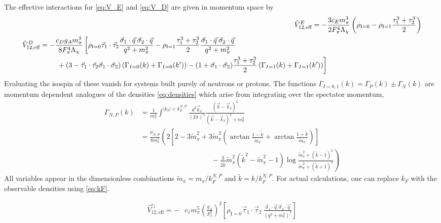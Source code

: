 \documentclass[%
 preprint,
 amsmath,amssymb,
 aps,
]{revtex4-1}
\newcommand{\veff}{\hat{V}_{12,\text{eff}}}
\newcommand{\rhozero}{\rho_{\text{I}=0}}
\newcommand{\rhoone}{\rho_{\text{I}=1}}
\newcommand{\taudot}{\vec{\tau}_1\cdot\vec{\tau}_2}
\newcommand{\sigmadot}{\vec{\sigma}_1\cdot\vec{\sigma}_2}
\begin{document}
 The effective interactions for \eqref{eq:V_E} and \eqref{eq:V_D} are given in momentum space by
 \begin{align}
 \veff^E=-&\frac{3c_Em_\pi^3}{2F_\pi^4 \Lambda_\chi}\left(\rhozero-\rhoone\frac{\tau_1^3+\tau_2^3}{2}\right)\\
 \begin{split}
 \veff^D=-&\frac{c_Dg_A m_\pi^3}{8 F_\pi^4\Lambda_\chi}\left[\rhozero\taudot \frac{\vec{\sigma}_1\cdot\vec{q}\:\vec{\sigma}_2\cdot\vec{q} }{q^2+m_\pi^2}  - \rhoone \frac{\tau_1^3+\tau_2^3}{2}\frac{\vec{\sigma}_1\cdot\vec{q}\:\vec{\sigma}_2\cdot\vec{q} }{q^2+m_\pi^2} \right. \\
&\left. \vphantom{\frac{1}{1}}+ (3-\taudot\sigmadot) \left(\Gamma_{I=0}(k)+\Gamma_{I=0}(k')\right)  -(1+\sigmadot)\frac{\tau_1^3+\tau_2^3}{2} \left(\Gamma_{I=1}(k) + \Gamma_{I=1}(k')\right) \right]
 \end{split} 
 \end{align}
Evaluating the isospin  of these vanish for systems built purely of neutrons or protons. The functions $\Gamma_{I=0,1}(k)=\Gamma_{P}(k)\pm\Gamma_{N}(k)$ are momentum dependent analogues of the densities \eqref{eq:densities} which arise from integrating over the spectator momentum,
 \begin{equation}
 \begin{split}
 \Gamma_{N,P}(k)&=\frac{1}{m_\pi^3}\int^{|k_\delta|<k_F^{N,P}}\frac{d^3\vec{k}_\delta}{(2\pi)^3} \frac{(\vec{k}-\vec{k}_\delta)^2}{(\vec{k}-\vec{k}_\delta)^2+m_\pi^2} \\
 &=\frac{\rho_{N,P}}{8m_\pi^3}\left(2\left[2-3\tilde{m}_\pi^2+3\tilde{m}_\pi^3\left(\arctan\frac{1-\tilde{k}}{\tilde{m}_\pi}+\arctan\frac{1+\tilde{k}}{\tilde{m}_\pi}\right)\right]\right. \\
 &\left.\qquad\qquad\qquad\qquad\qquad-\frac{3}{2 \tilde{k}}\tilde{m}_\pi^2\left(\tilde{k}^2-\tilde{m}_\pi^2-1\right)\log\frac{\tilde{m}_\pi^2+(\tilde{k}-1)^2}{\tilde{m}_\pi^2+(\tilde{k}+1)^2}\right)
 \end{split}
 \end{equation}
All variables appear in the dimensionless combinations $\tilde{m}_\pi=m_\pi/k_F^{N,P}$ and $\tilde{k}=k/k_F^{N,P}$. For actual calculations, one can replace $k_F$ with the observable densities using \eqref{eq:kF}.%

\begin{align}
 \veff^{c_1}=-&c_1 m_\pi^5\left(\frac{g_A}{F_\pi^2}\right)^2 \left[ \rhozero\vec{\tau}_1\cdot\vec{\tau}_2 \:\frac{\vec{\sigma}_1\cdot\vec{q}\:\vec{\sigma}_2\cdot\vec{q} }{\left(q^2+m_\pi^2\right)^2} \right]
\end{align}
 
\end{document}

